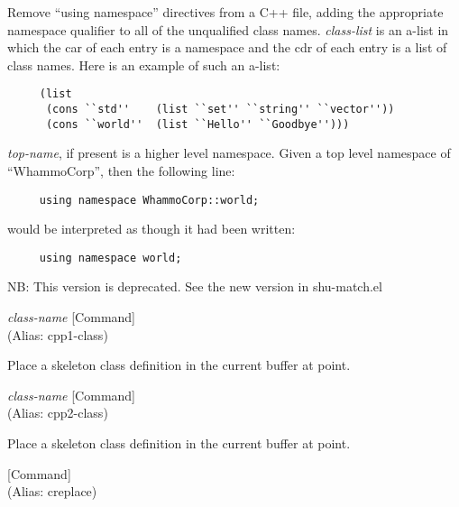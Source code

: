 \begin{doc-string}
Remove ``using namespace'' directives from a C++ file, adding the appropriate
namespace qualifier to all of the unqualified class names.  \emph{class-list} is an
a-list in which the car of each entry is a namespace and the cdr of each entry
is a list of class names.  Here is an example of such an a-list:

\small{\begin{verbatim}
     (list
      (cons ``std''    (list ``set'' ``string'' ``vector''))
      (cons ``world''  (list ``Hello'' ``Goodbye'')))
\end{verbatim}}

\emph{top-name}, if present is a higher level namespace.  Given a top level namespace
of ``WhammoCorp'', then the following line:

\small{\begin{verbatim}
     using namespace WhammoCorp::world;
\end{verbatim}}

would be interpreted as though it had been written:

\small{\begin{verbatim}
     using namespace world;
\end{verbatim}}

NB: This version is deprecated.  See the new version in shu-match.el
\end{doc-string}

\vspace{1em}
\noindent
{}
\usebox{\funcname}\emph{class-name}
 \hfill [Command]\\%
 (Alias: cpp1-class)

\begin{doc-string}
Place a skeleton class definition in the current buffer at point.
\end{doc-string}

\vspace{1em}
\noindent
{}
\usebox{\funcname}\emph{class-name}
 \hfill [Command]\\%
 (Alias: cpp2-class)

\begin{doc-string}
Place a skeleton class definition in the current buffer at point.
\end{doc-string}

\vspace{1em}
\noindent
{}
\usebox{\funcname}
 \hfill [Command]\\%
 (Alias: creplace)

